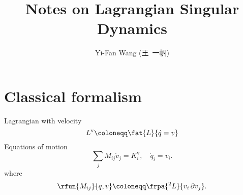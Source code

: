 \documentclass[a4paper,11pt]{article}
\title{Notes on Lagrangian Singular Dynamics}
\author{Yi-Fan Wang (王\ 一帆)}
\begin{document}
\maketitle

\section{Classical formalism}

Lagrangian with velocity
\begin{equation}
L^\text{v} \coloneqq \fat{L}{\dot{q} = v}
\end{equation}
Equations of motion
\begin{equation}
\sum_j M_{ij}\dot{v}_j = K^\text{v}_i,\quad
\dot{q}_i = v_i.
\end{equation}
where
\begin{equation}
\rfun{M_{ij}}{q,v} \coloneqq \frpa{^2 L}{v_i\,\partial v_j}.
\end{equation}
\end{document}

